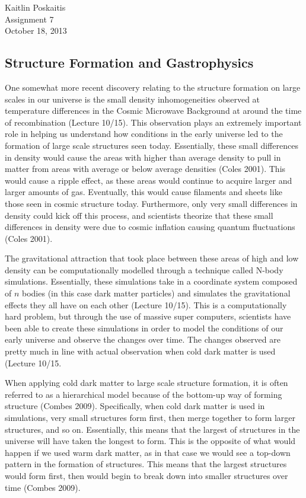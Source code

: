 \documentclass[12pt]{article}
\begin{document}
\noindent Kaitlin Poskaitis\\
Assignment 7\\
October 18, 2013
\begin{center}
    \section*{\bf Structure Formation and Gastrophysics}
\end{center}


One somewhat more recent discovery relating to the structure formation on large
scales in our universe is the small density inhomogeneities observed at
temperature differences in the Cosmic Microwave Background at around the time of
recombination (Lecture 10/15).  This observation plays an extremely important
role in helping us
understand how conditions in the early universe led to the formation of large
scale structures seen today.  Essentially, these small differences in density
would cause the areas with higher than average density to pull in matter from
areas with average or below average densities (Coles 2001).  This would cause
a ripple
effect, as these areas would continue to acquire larger and larger amounts of
gas.  Eventually, this would cause filaments and sheets like those seen in
cosmic structure today.  Furthermore, only very small differences in density
could kick off this process, and scientists theorize that these small
differences in density were due to cosmic inflation causing quantum
fluctuations (Coles 2001).

The gravitational attraction that took place between these areas of high and low
density can be computationally modelled through a technique called N-body
simulations.  Essentially, these simulations take in a coordinate system
composed of $n$ bodies (in this case dark matter particles) and simulates the
gravitational effects they all have on each other (Lecture 10/15).  This is a
computationally
hard problem, but through the use of massive super computers, scientists have
been able to create these simulations in order to model the conditions of our
early universe and observe the changes over time.  The changes observed are
pretty much in line with actual observation when cold dark matter is used
(Lecture 10/15. %

When applying cold dark matter to large scale structure formation, it is often
referred to as a hierarchical model because of the bottom-up way of forming
structure (Combes 2009).  Specifically, when cold dark matter is used in simulations,
very small structures form first, then merge together to form larger structures,
and so on.  Essentially, this means that the largest of structures in the
universe will have taken the longest to form.  This is the opposite of what
would happen if we used warm dark matter, as in that case we would see a
top-down pattern in the formation of structures.  This means that the largest
structures would form first, then would begin to break down into smaller
structures over time (Combes 2009).
\end{document}
